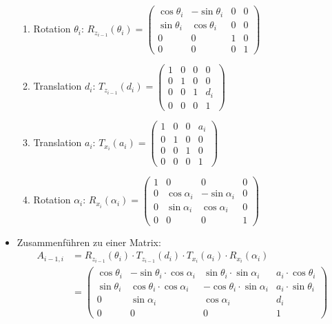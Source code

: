 \begin{itemize}
\begin{enumerate}
		\item Rotation $\theta_i$: $R_{z_{i-1}}(\theta_i)=\left(\begin{matrix}
			\cos\theta_i & -\sin\theta_i & 0 & 0 \\
			\sin\theta_i & \cos\theta_i & 0 & 0 \\
			0 & 0 & 1 & 0 \\
			0 & 0 & 0 & 1
		\end{matrix}\right)$
		\item Translation $d_i$: $T_{z_{i-1}}(d_i)=\left(\begin{matrix}
			1 & 0 & 0 & 0 \\
			0 & 1 & 0 & 0 \\
			0 & 0 & 1 & d_i \\
			0 & 0 & 0 & 1
		\end{matrix}\right)$
		\item Translation $a_i$: $T_{x_{i}}(a_i)=\left(\begin{matrix}
			1 & 0 & 0 & a_i \\
			0 & 1 & 0 & 0 \\
			0 & 0 & 1 & 0 \\
			0 & 0 & 0 & 1
		\end{matrix}\right)$
		\item Rotation $\alpha_i$:  $R_{x_{i}}(\alpha_i)=\left(\begin{matrix}
			1 & 0 & 0 & 0 \\
			0 & \cos\alpha_i & -\sin\alpha_i & 0 \\
			0 & \sin\alpha_i & \cos\alpha_i & 0 \\
			0 & 0 & 0 & 1
		\end{matrix}\right)$
	\end{enumerate}
	\item Zusammenführen zu einer Matrix:
	\begin{equation*}
	\begin{split}
		A_{i-1,i} &= R_{z_{i-1}}(\theta_i)\cdot T_{z_{i-1}}(d_i)\cdot T_{x_{i}}(a_i)\cdot R_{x_{i}}(\alpha_i) \\
			&= \left(\begin{matrix}
			\cos\theta_i & -\sin\theta_i\cdot\cos\alpha_i & \sin\theta_i\cdot\sin\alpha_i & a_i\cdot\cos\theta_i \\
			\sin\theta_i & \cos\theta_i\cdot\cos\alpha_i & -\cos\theta_i\cdot\sin\alpha_i & a_i\cdot\sin\theta_i \\
			0 & \sin\alpha_i & \cos\alpha_i & d_i \\
			0 & 0 & 0 & 1
		\end{matrix}\right)

\end{split}
\end{equation*}
\end{itemize}
